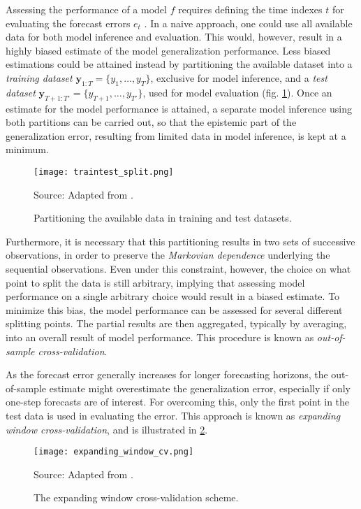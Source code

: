 Assessing the performance of a model $f$ requires defining the time indexes $t$ for evaluating the forecast errors $e_{t}$ . In a naive approach, one could use all available data for both model inference and evaluation. This would, however, result in a highly biased estimate of the model generalization performance. Less biased estimations could be attained instead by partitioning the available dataset into a \textit{training dataset} $\boldsymbol{y} _{1:T} = \{y_1,…,y_T\}$, exclusive for model inference, and a \textit{test dataset} $\boldsymbol{y} _{T+1:T'} = \{y_{T+1},…,y_{T'}\}$, used for model evaluation (fig. \ref{fig:training_test_split}). Once an estimate for the model performance is attained, a separate model inference using both partitions can be carried out, so that the epistemic part of the generalization error, resulting from limited data in model inference, is kept at a minimum.
\begin{figure}[H]%
	\centering
    \caption{Partitioning the available data in training and test datasets.}
    \texttt{[image: traintest\_split.png]} \\
    \raggedright
    Source: Adapted from \cite{krispin2019handson}.
	\label{fig:training_test_split}
\end{figure}

Furthermore, it is necessary that this partitioning results in two sets of successive observations, in order to preserve the \textit{Markovian dependence} underlying the sequential observations. Even under this constraint, however, the choice on what point to split the data is still arbitrary, implying that assessing model performance on a single arbitrary choice would result in a biased estimate. To minimize this bias, the model performance can be assessed for several different splitting points. The partial results are then aggregated, typically by averaging, into an overall result of model performance. This procedure is known as \textit{out-of-sample cross-validation}.

As the forecast error generally increases for longer forecasting horizons, the out-of-sample estimate might overestimate the generalization error, especially if only one-step forecasts are of interest. For overcoming this, only the  first point in the test data is used in evaluating the error. This approach is known as \textit{expanding window cross-validation}, and is illustrated in \ref{fig:expanding_window_cv}.
\begin{figure}[H]%
	\centering
    \caption{The expanding window cross-validation scheme.}
    \texttt{[image: expanding\_window\_cv.png]} \\
    \raggedright
    Source: Adapted from \cite{krispin2019handson}.
	\label{fig:expanding_window_cv}
\end{figure}


